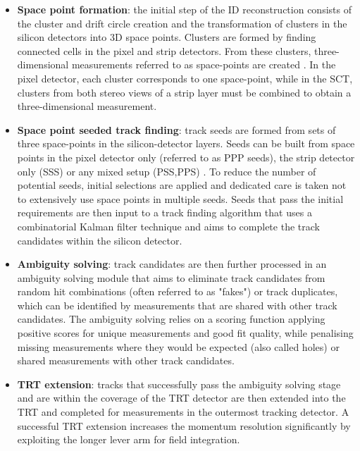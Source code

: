 \documentclass[a4paper, oneside, 11pt, openright]{book}
\begin{document}
		\begin{itemize}
			\item \textbf{Space point formation}: the initial step of the ID reconstruction consists of the cluster and drift circle creation and the transformation of clusters in the silicon detectors into 3D space points. Clusters are formed by finding connected cells in
			the pixel and strip detectors. From these clusters, three-dimensional measurements referred to as space-points are created \cite{Track reco}. In the pixel detector, each cluster corresponds to one space-point, while in the SCT, clusters from both stereo views of a strip layer must be combined to obtain a three-dimensional measurement. 
			
			\item \textbf{Space point seeded track finding}: track seeds are formed from sets of three space-points in the silicon-detector layers. Seeds can be built from space points in the pixel detector only (referred to as PPP seeds), the strip detector only (SSS) or any mixed setup (PSS,PPS) \cite{ID reco alg}. To reduce the number of potential seeds, initial selections are applied and dedicated care is taken not to
			extensively use space points in multiple seeds. Seeds that pass the initial requirements are then input to a track finding algorithm that uses a combinatorial Kalman filter technique \cite{Kalman} and aims to complete the track candidates within the silicon detector.
			
			\item \textbf{Ambiguity solving}: track candidates are then further processed in an ambiguity solving
			module that aims to eliminate track candidates from random hit combinations (often
			referred to as "fakes") or track duplicates, which can be identified by measurements that are shared with other track candidates. The ambiguity solving relies on a scoring function applying positive scores for unique measurements and good fit quality, while penalising missing measurements where they would be expected (also called holes) or shared measurements with other track candidates.
			
			\item \textbf{TRT extension}: tracks that successfully pass the ambiguity solving stage and are within the coverage of the TRT detector are then extended into the TRT and completed for measurements in the outermost tracking detector. A successful TRT extension increases the
			momentum resolution significantly by exploiting the longer lever arm for field integration.
		\end{itemize}
		
\end{document}
